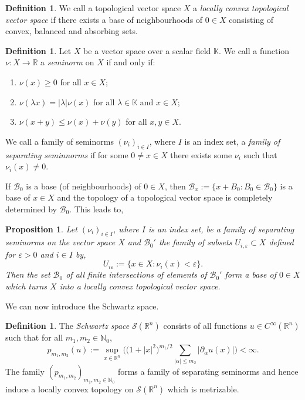\documentclass[a4paper, 12pt]{report}
\newtheorem{proposition}[theorem]{Proposition}
\theoremstyle{remark}
\theoremstyle{definition}
\newtheorem{definition}[theorem]{Definition}
\begin{document}
\begin{definition}
We call a topological vector space $X$ a \emph{locally convex topological vector space} if there exists a base of neighbourhoods of $0 \in X$ consisting of convex, balanced and absorbing sets.
\end{definition}

\begin{definition}
Let $X$ be a vector space over a scalar field $\mathbb{K}$.  We call a function $\nu : X \to \mathbb{R}$ a \emph{seminorm} on $X$ if and only if:
\begin{enumerate}
\item $\nu(x) \ge 0$ for all $x \in X$;

\item $\nu(\lambda x) = |\lambda|\nu(x)$ for all $\lambda \in \mathbb{K}$ and $x \in X$;

\item $\nu(x + y) \le \nu(x) + \nu(y)$ for all $x, y \in X$.
\end{enumerate}
We call a family of seminorms $(\nu_i)_{i \in I}$, where $I$ is an index set, a \emph{family of separating seminnorms} if for some $0 \ne x \in X$ there exists some $\nu_i$ such that $\nu_i(x) \ne 0$.
\end{definition}

If $\mathcal{B}_0$ is a base (of neighbourhoods) of $0 \in X$, then $\mathcal{B}_x := \{x + B_0 : B_0 \in \mathcal{B}_0\}$ is a base of $x \in X$ and the topology of a topological vector space is completely determined by $\mathcal{B}_0$.  This leads to,
\begin{proposition}
Let $(\nu_i)_{i \in I}$, where $I$ is an index set, be a family of separating seminorms on the vector space $X$ and $\mathcal{B}_0'$ the family of subsets $U_{i, \varepsilon} \subset X$ defined for $\varepsilon > 0$ and $i \in I$ by,
$$
U_{i \varepsilon} := \{x \in X : \nu_i(x) < \varepsilon\}.
$$
Then the set $\mathcal{B}_0$ of all finite intersections of elements of $\mathcal{B}_0'$ form a base of $0 \in X$ which turns $X$ into a locally convex topological vector space.
\end{proposition}

We can now introduce the Schwartz space.

\begin{definition}
The \emph{Schwartz space} $\mathcal{S}(\mathbb{R}^n)$ consists of all functions $u \in C^\infty(\mathbb{R}^n)$ such that for all $m_1, m_2 \in \mathbb{N}_0$,
\begin{equation}
p_{m_1, m_2}(u) := \sup_{x \in \mathbb{R}^n}\bigg(\big(1 + |x|^2\big)^{m_1/2}\sum_{|\alpha| \le m_2}|\partial_\alpha u(x)|\bigg) < \infty.
\end{equation}
The family $(p_{m_1, m_2})_{m_1, m_2 \in \mathbb{N}_0}$ forms a family of separating seminorms and hence induce a locally convex topology on $\mathcal{S}(\mathbb{R}^n)$ which is metrizable.
\end{definition}
\end{document}
